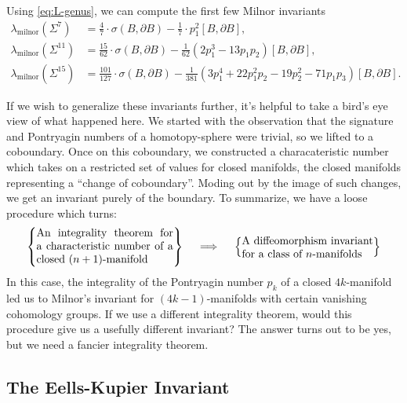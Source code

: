 \begin{example}
	Using \cref{eq:L-genus}, we can compute the first few Milnor invariants
	\[
		\begin{aligned}
			\lambda_{\mathrm{milnor}}(\Sigma^7)
			 & = \frac{4}{7}\cdot \sigma(B, \partial B) - \frac{1}{7}\cdot p_1^2[B, \partial B],
			 \\[0.5em]
			\lambda_{\mathrm{milnor}}(\Sigma^{11})
			 & = \frac{15}{62}\cdot \sigma(B,\partial B) - \frac{1}{62}\left(2p_1^3 - 13p_1p_2\right)[B,\partial B],
			 \\[0.5em]
			 \lambda_{\mathrm{milnor}}(\Sigma^{15})
			 &= \frac{101}{127}\cdot \sigma(B,\partial B) - \frac{1}{381}\left(3p_1^4 + 22p_1^2p_2 - 19p_2^2 - 71p_1p_3\right)[B,\partial B].
		\end{aligned}
	\]
\end{example}

If we wish to generalize these invariants further, it's helpful to take a bird's eye view of what happened here. We started with the observation that the signature and Pontryagin numbers of a homotopy-sphere were trivial, so we lifted to a coboundary. Once on this coboundary, we constructed a characateristic number which takes on a restricted set of values for closed manifolds, the closed manifolds representing a ``change of coboundary''. Moding out by the image of such changes, we get an invariant purely of the boundary. To summarize, we have a loose procedure which turns:
\[
	\left\{\parbox{12.5em}{An integrality theorem for a characteristic number of a closed $(n+1)$-manifold}\right\}
	\quad\implies \quad
	\left\{\parbox{12em}{A diffeomorphism invariant for a class of $n$-manifolds}\right\}
\]
In this case, the integrality of the Pontryagin number $p_k$ of a closed $4k$-manifold led us to Milnor's invariant for $(4k-1)$-manifolds with certain vanishing cohomology groups.
If we use a different integrality theorem, would this procedure give us a usefully different invariant? The answer turns out to be yes, but we need a fancier integrality theorem.


\subsection{The Eells-Kupier Invariant}\label{sec:eells-kupier_invariant}

